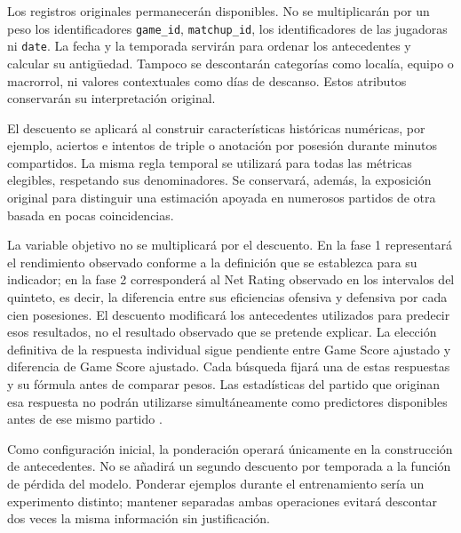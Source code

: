 Los registros originales permanecerán disponibles. No se multiplicarán por un peso los identificadores \texttt{game\_id}, \texttt{matchup\_id}, los identificadores de las jugadoras ni \texttt{date}. La fecha y la temporada servirán para ordenar los antecedentes y calcular su antigüedad. Tampoco se descontarán categorías como localía, equipo o macrorrol, ni valores contextuales como días de descanso. Estos atributos conservarán su interpretación original.

El descuento se aplicará al construir características históricas numéricas, por ejemplo, aciertos e intentos de triple o anotación por posesión durante minutos compartidos. La misma regla temporal se utilizará para todas las métricas elegibles, respetando sus denominadores. Se conservará, además, la exposición original para distinguir una estimación apoyada en numerosos partidos de otra basada en pocas coincidencias.

La variable objetivo no se multiplicará por el descuento. En la fase 1 representará el rendimiento observado conforme a la definición que se establezca para su indicador; en la fase 2 corresponderá al Net Rating observado en los intervalos del quinteto, es decir, la diferencia entre sus eficiencias ofensiva y defensiva por cada cien posesiones. El descuento modificará los antecedentes utilizados para predecir esos resultados, no el resultado observado que se pretende explicar. La elección definitiva de la respuesta individual sigue pendiente entre Game Score ajustado y diferencia de Game Score ajustado. Cada búsqueda fijará una de estas respuestas y su fórmula antes de comparar pesos. Las estadísticas del partido que originan esa respuesta no podrán utilizarse simultáneamente como predictores disponibles antes de ese mismo partido \cite{sklearnCommonPitfallsPonderacion}.

Como configuración inicial, la ponderación operará únicamente en la construcción de antecedentes. No se añadirá un segundo descuento por temporada a la función de pérdida del modelo. Ponderar ejemplos durante el entrenamiento sería un experimento distinto; mantener separadas ambas operaciones evitará descontar dos veces la misma información sin justificación.

